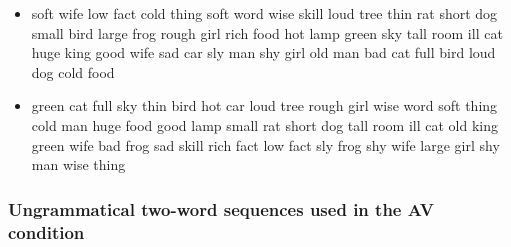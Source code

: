 \documentclass[11pt,a4wide]{article}
\begin{document}
\begin{itemize}
  \item soft wife low fact cold thing soft word wise skill loud tree
    thin rat short dog small bird large frog rough girl rich food hot
    lamp green sky tall room ill cat huge king good wife sad car sly
    man shy girl old man bad cat full bird loud dog cold food

  \item green cat full sky thin bird hot car loud tree rough girl wise
    word soft thing cold man huge food good lamp small rat short dog
    tall room ill cat old king green wife bad frog sad skill rich fact
    low fact sly frog shy wife large girl shy man wise thing

\end{itemize}

\subsubsection*{Ungrammatical two-word sequences used in the AV condition}
\end{document}

